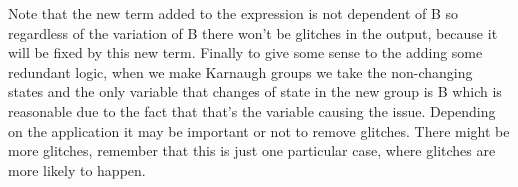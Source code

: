 \documentclass[a4paper,12pt]{article}
\begin{document}
Note that the new term added to the expression is not dependent
of B so regardless of the variation of B there won't be glitches
in the output, because it will be fixed by this new term.
\linebreak
Finally to give some sense to the adding some redundant logic,
when we make Karnaugh groups we take the non-changing states and
the only variable that changes of state in the new group is B
which is reasonable due to the fact that that's the variable 
causing the issue.
Depending on the application it may be important or not to remove
glitches.
There might be more glitches, remember that this is just one particular case,
where glitches are more likely to happen.
\end{document}
